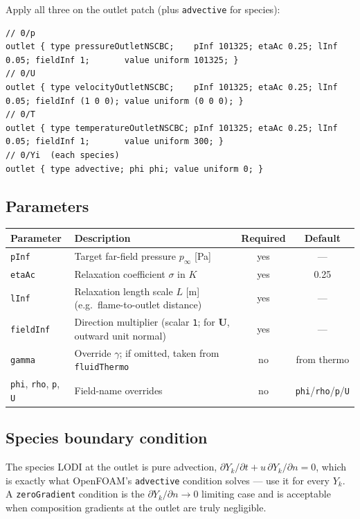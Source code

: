 \documentclass[11pt,a4paper]{article}
\newcommand{\code}[1]{\texttt{#1}}
\begin{document}
Apply all three on the outlet patch (plus \code{advective} for species):
\begin{lstlisting}
// 0/p
outlet { type pressureOutletNSCBC;    pInf 101325; etaAc 0.25; lInf 0.05; fieldInf 1;       value uniform 101325; }
// 0/U
outlet { type velocityOutletNSCBC;    pInf 101325; etaAc 0.25; lInf 0.05; fieldInf (1 0 0); value uniform (0 0 0); }
// 0/T
outlet { type temperatureOutletNSCBC; pInf 101325; etaAc 0.25; lInf 0.05; fieldInf 1;       value uniform 300; }
// 0/Yi  (each species)
outlet { type advective; phi phi; value uniform 0; }
\end{lstlisting}

\subsection{Parameters}
\begin{center}
\begin{tabular}{lp{8.4cm}cc}
\toprule
Parameter & Description & Required & Default \\
\midrule
\code{pInf}     & Target far-field pressure $p_\infty$ [Pa] & yes & --- \\
\code{etaAc}    & Relaxation coefficient $\sigma$ in $K$    & yes & 0.25 \\
\code{lInf}     & Relaxation length scale $L$ [m] (e.g.\ flame-to-outlet distance) & yes & --- \\
\code{fieldInf} & Direction multiplier (scalar \code{1}; for $\mathbf U$, outward unit normal) & yes & --- \\
\code{gamma}    & Override $\gamma$; if omitted, taken from \code{fluidThermo} & no & from thermo \\
\code{phi}, \code{rho}, \code{p}, \code{U} & Field-name overrides & no & \code{phi}/\code{rho}/\code{p}/\code{U} \\
\bottomrule
\end{tabular}
\end{center}

\subsection{Species boundary condition}\label{sec:species}
The species LODI at the outlet is pure advection,
$\partial Y_k/\partial t+u\,\partial Y_k/\partial n=0$, which is exactly what
OpenFOAM's \code{advective} condition solves --- use it for every $Y_k$. A
\code{zeroGradient} condition is the $\partial Y_k/\partial n\to0$ limiting case
and is acceptable when composition gradients at the outlet are truly negligible.
\end{document}
